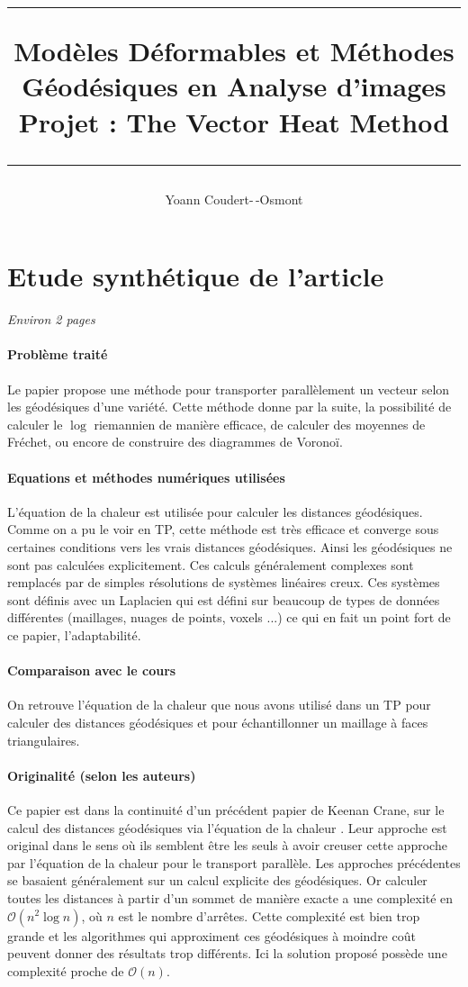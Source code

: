 \documentclass[11pt]{article}
\title{
	\noindent\rule{\linewidth}{0.4pt}
	{ \huge Modèles Déformables et Méthodes Géodésiques en Analyse d’images } \\
	Projet : The Vector Heat Method \cite{VHM}
	\noindent\rule{\linewidth}{1pt}
}
\author{Yoann Coudert-\,-Osmont}
\begin{document}
	
	\maketitle
	
	\section{Etude synthétique de l'article}
	
	\emph{Environ 2 pages} \\
	
	\paragraph{Problème traité}
	Le papier propose une méthode pour transporter parallèlement un vecteur selon les géodésiques d'une variété. Cette méthode donne par la suite, la possibilité de calculer le $\log$ riemannien de manière efficace, de calculer des moyennes de Fréchet, ou encore de construire des diagrammes de Voronoï.
	
	\paragraph{Equations et méthodes numériques utilisées}
	L'équation de la chaleur est utilisée pour calculer les distances géodésiques. Comme on a pu le voir en TP, cette méthode est très efficace et converge sous certaines conditions vers les vrais distances géodésiques. Ainsi les géodésiques ne sont pas calculées explicitement. Ces calculs généralement complexes sont remplacés par de simples résolutions de systèmes linéaires creux. Ces systèmes sont définis avec un Laplacien qui est défini sur beaucoup de types de données différentes (maillages, nuages de points, voxels ...) ce qui en fait un point fort de ce papier, l'adaptabilité.
	
	\paragraph{Comparaison avec le cours}
	On retrouve l'équation de la chaleur que nous avons utilisé dans un TP pour calculer des distances géodésiques et pour échantillonner un maillage à faces triangulaires.
	
	\paragraph{Originalité (selon les auteurs)}
	Ce papier est dans la continuité d'un précédent papier de Keenan Crane, sur le calcul des distances géodésiques via l'équation de la chaleur \cite{HM}. Leur approche est original dans le sens où ils semblent être les seuls à avoir creuser cette approche par l'équation de la chaleur pour le transport parallèle. Les approches précédentes se basaient généralement sur un calcul explicite des géodésiques. Or calculer toutes les distances à partir d'un sommet de manière exacte a une complexité en $\mathcal{O}(n^2 \log n)$, où $n$ est le nombre d'arrêtes. Cette complexité est bien trop grande et les algorithmes qui approximent ces géodésiques à moindre coût peuvent donner des résultats trop différents. Ici la solution proposé possède une complexité proche de $\mathcal{O}(n)$.
	
\end{document}
